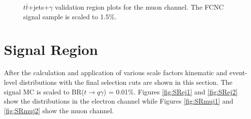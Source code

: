 \begin{figure}[h!]
\hfil  %
\caption{$t\bar{t}$+jets+$\gamma$ validation region plots for the muon channel.  The FCNC signal sample is scaled to 1.5\%.} %
\label{fig:VR2muj}
\end{figure}



\section{Signal Region}
\label{sec:SRPlots}
After the calculation and application of various scale factors kinematic and event-level distributions with the final selection cuts are shown in this section.  The signal MC is scaled to BR($t\rightarrow q\gamma$) = 0.01\%.  Figures \ref{fig:SRej1} and \ref{fig:SRej2} show the distributions in the electron channel while Figures \ref{fig:SRmuj1} and \ref{fig:SRmuj2} show the muon channel.  %

